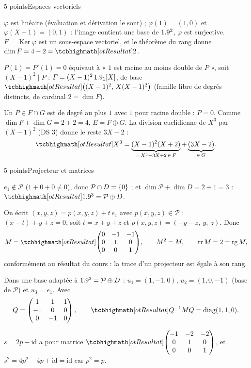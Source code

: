 \begin{corrigeEval}{5 points}{Espaces vectoriels}
\begin{questions}
  \item $\varphi$ est linéaire (évaluation et dérivation le sont) ;
    $\varphi(1)=(1,0)$ et $\varphi(X-1)=(0,1)$ : l'image contient une base
    de $1.9^{2}$, $\varphi$ est surjective. $F=\operatorname{Ker}\varphi$ est
    un sous-espace vectoriel, et le théorème du rang donne
    $\dim F=4-2=\res{2}$. 
  \item $P(1)=P'(1)=0$ équivaut à « $1$ est racine au moins double de
    $P$ », soit $(X-1)^{2}\mid P$ : $F=(X-1)^{2}\,1.9_1[X]$, de base
    $\res{\bigl((X-1)^{2},\,X(X-1)^{2}\bigr)}$ (famille libre de degrés
    distincts, de cardinal $2=\dim F$). 
  \item Un $P\in F\cap G$ est de degré au plus $1$ avec $1$ pour racine
    double : $P=0$. Comme $\dim F+\dim G=2+2=4$, $E=F\oplus G$. La division
    euclidienne de $X^{3}$ par $(X-1)^{2}$ (DS 3) donne le reste $3X-2$ :
    \[\res{X^{3}=\underbrace{(X-1)^{2}(X+2)}_{=\,X^{3}-3X+2\,\in\,F}+\underbrace{(3X-2)}_{\in\,G}}.\]
\end{questions}
\end{corrigeEval}

\begin{corrigeEval}{5 points}{Projecteur et matrices}
\begin{questions}
  \item $e_1\notin\mathcal{P}$ ($1+0+0\neq0$), donc
    $\mathcal{P}\cap D=\left\{0\right\}$ ; et $\dim\mathcal{P}+\dim D=2+1=3$ :
    $\res{\R^{3}=\mathcal{P}\oplus D}$. \pts{1 pt}
  \item On écrit $(x,y,z)=p(x,y,z)+t\,e_1$ avec $p(x,y,z)\in\mathcal{P}$ :
    $(x-t)+y+z=0$, soit $t=x+y+z$ et $p(x,y,z)=(-y-z,\ y,\ z)$. Donc
    \[M=\res{\begin{pmatrix}0&-1&-1\\0&1&0\\0&0&1\end{pmatrix}},\qquad M^{2}=M,\qquad
      \operatorname{tr}M=2=\operatorname{rg}M,\]
    conformément au résultat du cours : la trace d'un projecteur est égale
    à son rang. 
  \item Dans une base adaptée à $1.9^{3}=\mathcal{P}\oplus D$ : $u_1=(1,-1,0)$,
    $u_2=(1,0,-1)$ (base de $\mathcal{P}$) et $u_3=e_1$. Avec
    \[Q=\begin{pmatrix}1&1&1\\-1&0&0\\0&-1&0\end{pmatrix},\qquad
      \res{Q^{-1}MQ=\operatorname{diag}(1,1,0)}.\]
  \item $s=2p-\mathrm{id}$ a pour matrice
    $\res{\begin{pmatrix}-1&-2&-2\\0&1&0\\0&0&1\end{pmatrix}}$, et
    $s^{2}=4p^{2}-4p+\mathrm{id}=\mathrm{id}$ car $p^{2}=p$. \pts{1 pt}
\end{questions}
\end{corrigeEval}
